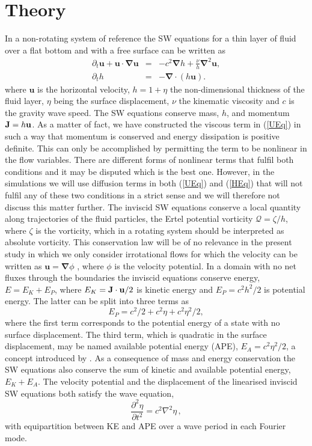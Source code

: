 \documentclass{jfm}
\providecommand\bnabla{\boldsymbol{\nabla}}
\newcommand\p{\ensuremath{\partial}}
\newcommand{\uu}{\textbf{u}}
\newcommand{\ErtelPV}{\mathcal{Q}}
\begin{document}
\section{Theory}

In a non-rotating system of reference the SW equations for a thin layer of fluid over a flat bottom and with a free
surface can be written as  \cite[see for example][]{VallisLIVRE2006}
\begin{eqnarray} \label{UEq}
\p_t \uu + \uu\cdot \bnabla  \uu   
&=& - c^2 \bnabla h + \frac{\nu}{h}  \bnabla^2 \uu,   \label{eq_uu}\\ \label{HEq}
\p_t   h    &=& - \bnabla \cdot (h \uu).  \label{eq_h}
\end{eqnarray}
where $\uu$ is the horizontal velocity, %
$h = 1 + \eta $ the non-dimensional thickness of the fluid layer,  $ \eta $ being the surface displacement, 
$\nu$ the kinematic viscosity and $ c $ is the gravity wave speed. The SW equations conserve mass, $ h $, and momentum $ {\bf J} = h{\bf u} $. As a matter of fact, we have constructed the viscous term in (\ref{UEq}) in such a way that momentum is conserved and energy dissipation is positive definite. This can only be accomplished by permitting the term to be nonlinear in the flow variables. There are different forms of nonlinear terms that fulfil both conditions and it may be disputed which is the best one. However, in the simulations we will use diffusion terms in both (\ref{UEq}) and (\ref{HEq}) that will not fulfil any of these two conditions in a strict sense and we will therefore not discuss this matter further. The inviscid SW equations conserve a local
quantity along trajectories of the fluid particles, the Ertel
potential vorticity $\ErtelPV = \zeta /h$, where $\zeta  $ is the vorticity, which in a rotating system should be interpreted as absolute vorticity.  This conservation law will be of no relevance in the present study in which we only consider
irrotational flows for which the velocity can be written as $ \uu = \bnabla \phi $ , where $ \phi $ is the velocity potential. In a domain with no net fluxes through the boundaries the inviscid equations conserve energy, $ E = E_K + E_P $, where $ E_K =   {\bf J}  \cdot {\uu} /2 $ is kinetic energy and $ E_P = c^{2} h^2/2 $ is potential energy. The latter can be split into three terms as \begin{equation}
E_P = c^2/2 + c^2\eta+ c^2 \eta^2/2, 
\end{equation}
where the first term corresponds to the potential energy of a state with no
surface displacement.  The third term, which is quadratic in the surface displacement, may be named available potential energy (APE),
$E_A = c^2\eta^2/2$, a concept introduced by  \cite{Lorenz1955}. As a consequence of mass and energy conservation the SW equations also conserve the sum of kinetic and available potential energy, $ E_K + E_A $.
 The velocity potential and the displacement of the linearised inviscid SW equations both satisfy the wave equation,
\begin{equation}
\frac{\partial ^2 \eta}{\partial t^2} = c^2 \nabla^2 \eta \, ,
\end{equation}
with equipartition between KE and APE over a wave period in each Fourier mode.
\end{document}
